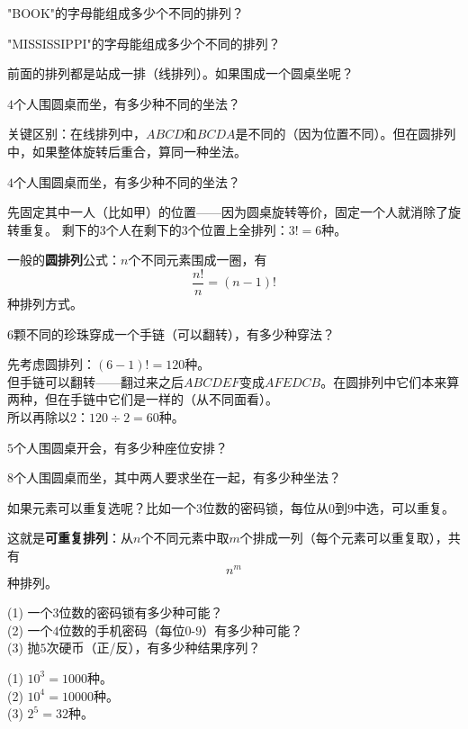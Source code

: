 \begin{exercise}
\item "BOOK"的字母能组成多少个不同的排列？
\item "MISSISSIPPI"的字母能组成多少个不同的排列？
\end{exercise}


前面的排列都是站成一排（线排列）。如果围成一个圆桌坐呢？

$4$个人围圆桌而坐，有多少种不同的坐法？

关键区别：在线排列中，$ABCD$和$BCDA$是不同的（因为位置不同）。但在圆排列中，如果整体旋转后重合，算同一种坐法。

\begin{example}
$4$个人围圆桌而坐，有多少种不同的坐法？
\end{example}
\begin{solution}
先固定其中一人（比如甲）的位置——因为圆桌旋转等价，固定一个人就消除了旋转重复。
剩下的$3$个人在剩下的$3$个位置上全排列：$3! = 6$种。

一般的\textbf{圆排列}公式：$n$个不同元素围成一圈，有
\[
\frac{n!}{n} = (n-1)!
\]
种排列方式。
\end{solution}

\begin{example}
$6$颗不同的珍珠穿成一个手链（可以翻转），有多少种穿法？
\end{example}
\begin{solution}
先考虑圆排列：$(6-1)! = 120$种。\\
但手链可以翻转——翻过来之后$ABCDEF$变成$AFEDCB$。在圆排列中它们本来算两种，但在手链中它们是一样的（从不同面看）。\\
所以再除以$2$：$120\div2 = 60$种。
\end{solution}

\begin{exercise}
\item $5$个人围圆桌开会，有多少种座位安排？
\item $8$个人围圆桌而坐，其中两人要求坐在一起，有多少种坐法？
\end{exercise}


如果元素可以重复选呢？比如一个$3$位数的密码锁，每位从$0$到$9$中选，可以重复。

这就是\textbf{可重复排列}：从$n$个不同元素中取$m$个排成一列（每个元素可以重复取），共有
\[
n^m
\]
种排列。

\begin{example}
(1) 一个$3$位数的密码锁有多少种可能？\\
(2) 一个$4$位数的手机密码（每位$0$-$9$）有多少种可能？\\
(3) 抛$5$次硬币（正/反），有多少种结果序列？
\end{example}
\begin{solution}
(1) $10^3 = 1000$种。\\
(2) $10^4 = 10000$种。\\
(3) $2^5 = 32$种。
\end{solution}

